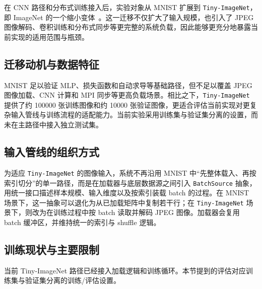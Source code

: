 \documentclass[a4paper,11pt,oneside]{article}
\begin{document}
在 CNN 路径和分布式训练接入后，实验对象从 MNIST 扩展到 \texttt{Tiny-ImageNet}，即 ImageNet 的一个缩小变体~\cite{deng2009imagenet}。这一迁移不仅扩大了输入规模，也引入了 JPEG 图像解码、卷积训练和分布式同步等更完整的系统负载，因此能够更充分地暴露当前实现的适用范围与瓶颈。

\subsection{迁移动机与数据特征}

MNIST 足以验证 MLP、损失函数和自动求导等基础路径，但不足以覆盖 JPEG 图像加载、CNN 计算和 MPI 同步等更高负载场景。相比之下，\texttt{Tiny-ImageNet} 提供了约 100000 张训练图像和约 10000 张验证图像，更适合评估当前实现对更复杂输入管线与训练流程的适配能力。当前实验采用训练集与验证集分离的设置，而未在主路径中接入独立测试集。

\subsection{输入管线的组织方式}

为适应 \texttt{Tiny-ImageNet} 的图像输入，系统不再沿用 MNIST 中“先整体载入、再按索引切分”的单一路径，而是在加载器与底层数据源之间引入 \texttt{BatchSource} 抽象，用统一接口描述样本规模、输入维度以及按索引装载 batch 的过程。在 MNIST 场景下，这一抽象可以退化为从已加载矩阵中复制若干行；在 \texttt{Tiny-ImageNet} 场景下，则改为在训练过程中按 batch 读取并解码 JPEG 图像。加载器会复用 batch 缓冲区，并维持统一的索引与 shuffle 逻辑。

\subsection{训练现状与主要限制}

当前 Tiny-ImageNet 路径已经接入加载逻辑和训练循环。本节提到的评估对应训练集与验证集分离的训练/评估设置。
\end{document}
